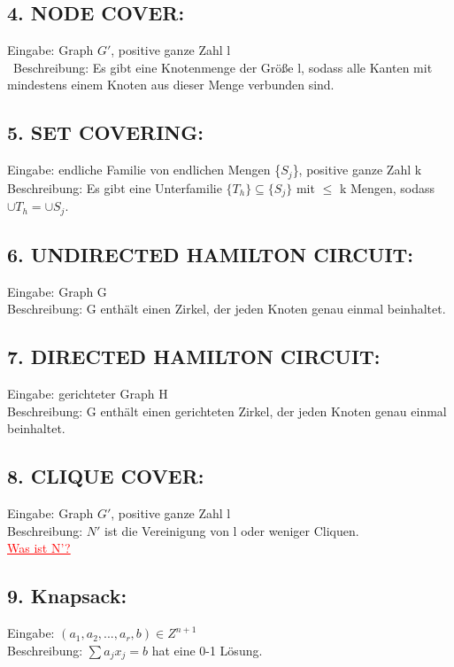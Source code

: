 \documentclass[a4paper,11pt,twoside]{article}
\newcommand{\korr}[2]{\sout{#1} \textcolor{red}{\underline{#2}}}
\begin{document}
\subsection*{4. NODE COVER:}
Eingabe: Graph $G'$, positive ganze Zahl l\\\
Beschreibung: Es gibt eine Knotenmenge der Größe l, sodass alle Kanten mit mindestens einem Knoten aus dieser Menge verbunden sind.\\

\subsection*{5. SET COVERING:}
Eingabe: endliche Familie von endlichen Mengen \{$S_j$\}, positive ganze Zahl k\\
Beschreibung: Es gibt eine Unterfamilie  $\{T_h\} \subseteq \{S_j\}$ mit $\leq$ k Mengen, sodass $\cup T_h = \cup S_j$.\\

\subsection*{6. UNDIRECTED HAMILTON CIRCUIT:}
Eingabe: Graph G\\
Beschreibung: G enthält einen Zirkel, der jeden Knoten genau einmal beinhaltet.\\

\subsection*{7. DIRECTED HAMILTON CIRCUIT:}
Eingabe: gerichteter Graph H\\
Beschreibung: G enthält einen gerichteten Zirkel, der jeden Knoten genau einmal beinhaltet. \\

\subsection*{8. CLIQUE COVER:}
Eingabe: Graph $G'$, positive ganze Zahl l\\
Beschreibung: $N'$ ist die Vereinigung von l oder weniger Cliquen.\\
\korr{}{Was ist N'?}

\subsection*{9. Knapsack:}
Eingabe: $(a_1, a_2, ..., a_r, b) \in Z^{n+1}$\\
Beschreibung: $\sum a_j x_j = b$ hat eine 0-1 Lösung.\\
\end{document}
